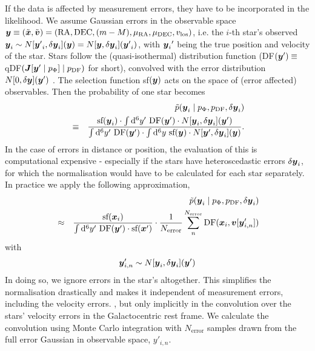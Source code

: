 If the data is affected by measurement errors, they have to be incorporated in the likelihood. We assume Gaussian errors in the observable space $\boldsymbol{y} \equiv (\tilde{\boldsymbol{x}},\tilde{\boldsymbol{v}})=(\text{RA},\text{DEC},(m-M),\mu_\text{RA},\mu_\text{DEC},v_\text{los})$, i.e. the $i$-th star's observed $\boldsymbol{y}_i \sim N[{\boldsymbol{y}'}_i,\delta \boldsymbol{y}_i](\boldsymbol{y}) = N[\boldsymbol{y},\delta \boldsymbol{y}_i]({\boldsymbol{y}'}_i)$, with ${\boldsymbol{y}_i}'$ being the true position and velocity of the star. Stars follow the (quasi-isothermal) distribution function (DF$(\boldsymbol{y}') \equiv$ qDF$(\boldsymbol{J}[\boldsymbol{y}' \mid p_\Phi] \mid p_\text{DF})$ for short), convolved with the error distribution $N[0,\delta \boldsymbol{y}](\boldsymbol{y}')$ . The selection function sf$(\boldsymbol{y})$ acts on the space of (error affected) observables. 
Then the probability of one star becomes
\begin{eqnarray*}
&&\tilde{p}(\boldsymbol{y}_i \mid p_\Phi,p_\text{DF},\delta \boldsymbol{y}_i)\\
& \equiv& \frac{\text{sf}(\boldsymbol{y}_i) \cdot \int \mathop{}\!\mathrm{d^6} y' \  \text{DF}(\boldsymbol{y}') \cdot N[\boldsymbol{y}_i,\delta \boldsymbol{y}_i](\boldsymbol{y}')}{\int \mathop{}\!\mathrm{d^6}y'  \  \text{DF}(\boldsymbol{y}')  \cdot  \int \mathop{}\!\mathrm{d^6} y \  \text{sf}(\boldsymbol{y})  \cdot N[\boldsymbol{y}',\delta \boldsymbol{y}_i](\boldsymbol{y})}.
\end{eqnarray*}
In the case of errors in distance or position, the evaluation of this is computational expensive - especially if the stars have heteroscedastic errors $\delta \boldsymbol{y}_i$, for which the normalisation would have to be calculated for each star separately. In practice we apply the following approximation,
\begin{eqnarray}
&&\tilde{p}(\boldsymbol{y}_i \mid p_\Phi,p_\text{DF},\delta \boldsymbol{y}_i) \nonumber\\
&\approx& \frac{ \text{sf}(\boldsymbol{x}_i)}{\int \mathop{}\!\mathrm{d^6}y'  \  \text{DF}(\boldsymbol{y}')  \cdot   \text{sf}(\boldsymbol{x}')} \cdot \frac{1}{N_\text{error}} \sum_n^{N_\text{error}}  \text{DF}(\boldsymbol{x}_i,\boldsymbol{v}[\boldsymbol{y}'_{i,n}]) \label{eq:errorconv}
\end{eqnarray}
with
\begin{eqnarray}
\boldsymbol{y}'_{i,n} \sim N[\boldsymbol{y}_i,\delta \boldsymbol{y}_i](\boldsymbol{y}')\nonumber
\end{eqnarray}
In doing so, we ignore errors in the star's  altogether. This simplifies the normalisation drastically and makes it independent of measurement errors, including the velocity errors. , but only implicitly in the convolution over the stars' velocity errors in the Galactocentric rest frame. We calculate the convolution using Monte Carlo integration with $N_\text{error}$ samples drawn from the full error Gaussian in observable space, $y'_{i,n}$. \\
